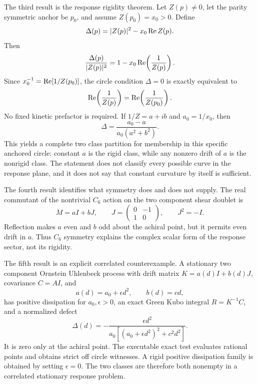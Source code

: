 The third result is the response rigidity theorem. Let $Z(p)\ne0$, let the parity symmetric anchor be $p_0$, and assume $Z(p_0)=x_0>0$. Define
\begin{equation}
 \Delta(p)=|Z(p)|^2-x_0\operatorname{Re} Z(p).
 \label{eq:intro_defect}
\end{equation}
Then
\begin{equation}
 \frac{\Delta(p)}{|Z(p)|^2}
 =1-x_0\operatorname{Re}\!\left(\frac{1}{Z(p)}\right).
 \label{eq:intro_inverse_identity}
\end{equation}
Since $x_0^{-1}=\operatorname{Re}[1/Z(p_0)]$, the circle condition $\Delta=0$ is exactly equivalent to
\begin{equation}
 \operatorname{Re}\!\left(\frac1{Z(p)}\right)
 =\operatorname{Re}\!\left(\frac1{Z(p_0)}\right).
 \label{eq:intro_rigidity}
\end{equation}
No fixed kinetic prefactor is required. If $1/Z=a+i b$ and $a_0=1/x_0$, then
\begin{equation}
 \Delta=\frac{a_0-a}{a_0(a^2+b^2)}.
 \label{eq:intro_defect_ab}
\end{equation}
This yields a complete two class partition for membership in this specific anchored circle: constant $a$ is the rigid class, while any nonzero drift of $a$ is the nonrigid class. The statement does not classify every possible curve in the response plane, and it does not say that constant curvature by itself is sufficient.

The fourth result identifies what symmetry does and does not supply. The real commutant of the nontrivial $C_6$ action on the two component shear doublet is
\begin{equation}
 M=aI+bJ,
 \qquad
 J=\begin{pmatrix}0&-1\\1&0\end{pmatrix},
 \qquad J^2=-I.
 \label{eq:intro_commutant}
\end{equation}
Reflection makes $a$ even and $b$ odd about the achiral point, but it permits even drift in $a$. Thus $C_6$ symmetry explains the complex scalar form of the response sector, not its rigidity.

The fifth result is an explicit correlated counterexample. A stationary two component Ornstein Uhlenbeck process with drift matrix $K=a(d)I+b(d)J$, covariance $C=AI$, and
\begin{equation}
 a(d)=a_0+\epsilon d^2,
 \qquad
 b(d)=cd,
 \label{eq:intro_ou}
\end{equation}
has positive dissipation for $a_0,\epsilon>0$, an exact Green Kubo integral $R=K^{-1}C$, and a normalized defect
\begin{equation}
 \Delta(d)=
 -\frac{\epsilon d^2}
 {a_0\left[(a_0+\epsilon d^2)^2+c^2d^2\right]}.
 \label{eq:intro_ou_defect}
\end{equation}
It is zero only at the achiral point. The executable exact test evaluates \CRTCCounterGridPoints{} rational points and obtains \CRTCCounterOffCircle{} strict off circle witnesses. A rigid positive dissipation family is obtained by setting $\epsilon=0$. The two classes are therefore both nonempty in a correlated stationary response problem.

